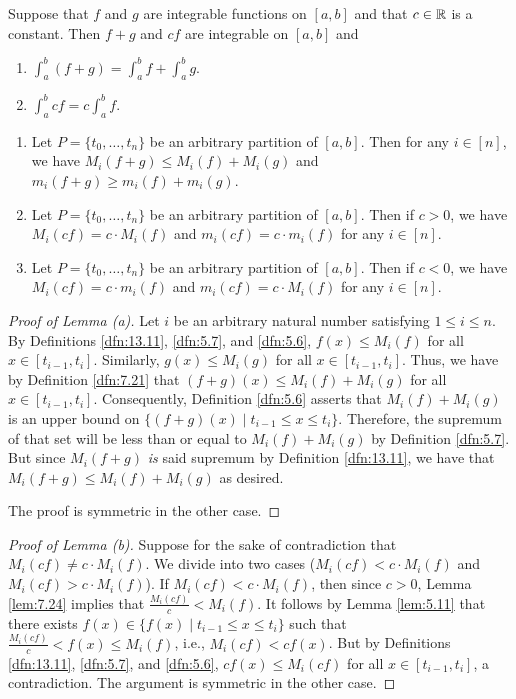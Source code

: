 \documentclass[../main.tex]{subfiles}
\begin{document}
\begin{theorem}\label{trm:13.24}
    Suppose that $f$ and $g$ are integrable functions on $[a,b]$ and that $c\in\mathbb{R}$ is a constant. Then $f+g$ and $cf$ are integrable on $[a,b]$ and
    \begin{enumerate}[label={\textup{(}\alph*\textup{)}},ref={\thetheorem\alph*}]
        \item \label{trm:13.24a}$\int_a^b(f+g) = \int_a^bf+\int_a^bg$.
        \item \label{trm:13.24b}$\int_a^bcf = c\int_a^bf$.
    \end{enumerate}
    \begin{lemma*}\leavevmode
        \begin{enumerate}[label={\textup{(}\alph*\textup{)}}]
            \item Let $P=\{t_0,\dots,t_n\}$ be an arbitrary partition of $[a,b]$. Then for any $i\in[n]$, we have $M_i(f+g)\leq M_i(f)+M_i(g)$ and $m_i(f+g)\geq m_i(f)+m_i(g)$.
            \item Let $P=\{t_0,\dots,t_n\}$ be an arbitrary partition of $[a,b]$. Then if $c>0$, we have $M_i(cf)=c\cdot M_i(f)$ and $m_i(cf)=c\cdot m_i(f)$ for any $i\in[n]$.
            \item Let $P=\{t_0,\dots,t_n\}$ be an arbitrary partition of $[a,b]$. Then if $c<0$, we have $M_i(cf)=c\cdot m_i(f)$ and $m_i(cf)=c\cdot M_i(f)$ for any $i\in[n]$.
        \end{enumerate}
        \begin{proof}[Proof of Lemma \textup{(}a\textup{)}]
            Let $i$ be an arbitrary natural number satisfying $1\leq i\leq n$. By Definitions \ref{dfn:13.11}, \ref{dfn:5.7}, and \ref{dfn:5.6}, $f(x)\leq M_i(f)$ for all $x\in[t_{i-1},t_i]$. Similarly, $g(x)\leq M_i(g)$ for all $x\in[t_{i-1},t_i]$. Thus, we have by Definition \ref{dfn:7.21} that $(f+g)(x)\leq M_i(f)+M_i(g)$ for all $x\in[t_{i-1},t_i]$. Consequently, Definition \ref{dfn:5.6} asserts that $M_i(f)+M_i(g)$ is an upper bound on $\{(f+g)(x)\mid t_{i-1}\leq x\leq t_i\}$. Therefore, the supremum of that set will be less than or equal to $M_i(f)+M_i(g)$ by Definition \ref{dfn:5.7}. But since $M_i(f+g)$ \emph{is} said supremum by Definition \ref{dfn:13.11}, we have that $M_i(f+g)\leq M_i(f)+M_i(g)$ as desired.\par
            The proof is symmetric in the other case.
        \end{proof}
        \begin{proof}[Proof of Lemma \textup{(}b\textup{)}]
            Suppose for the sake of contradiction that $M_i(cf)\neq c\cdot M_i(f)$. We divide into two cases ($M_i(cf)<c\cdot M_i(f)$ and $M_i(cf)>c\cdot M_i(f)$). If $M_i(cf)<c\cdot M_i(f)$, then since $c>0$, Lemma \ref{lem:7.24} implies that $\frac{M_i(cf)}{c}<M_i(f)$. It follows by Lemma \ref{lem:5.11} that there exists $f(x)\in\{f(x)\mid t_{i-1}\leq x\leq t_i\}$ such that $\frac{M_i(cf)}{c}<f(x)\leq M_i(f)$, i.e., $M_i(cf)<cf(x)$. But by Definitions \ref{dfn:13.11}, \ref{dfn:5.7}, and \ref{dfn:5.6}, $cf(x)\leq M_i(cf)$ for all $x\in[t_{i-1},t_i]$, a contradiction. The argument is symmetric in the other case.\par

\end{proof}
\end{lemma*}
\end{theorem}
\end{document}
